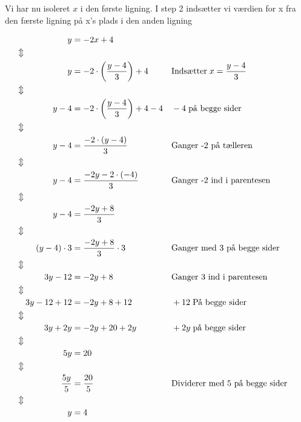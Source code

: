 Vi har nu isoleret $x$ i den første ligning. I step 2 indsætter vi værdien for x fra den færste ligning på x's plads i den anden ligning

\begin{align*}
    y &= -2x + 4\\
    \Updownarrow \hspace{2cm}&\\
    y &= -2\cdot \left(\frac{y - 4}{3}\right) + 4 && \text{Indsætter} \hspace{1mm} x = \frac{y - 4}{3}\\
    \Updownarrow \hspace{2cm}&\\
    y - 4 &= -2\cdot \left(\frac{y - 4}{3}\right) + 4 - 4 && -4 \hspace{1mm} \text{på begge sider}\\
    \Updownarrow \hspace{2cm}&\\
    y - 4 &= \frac{-2\cdot (y - 4)}{3}&& \text{Ganger -2 på tælleren}\\
    \Updownarrow \hspace{2cm}&\\
    y - 4 &= \frac{-2y -2\cdot (-4)}{3} && \text{Ganger -2 ind i parentesen}\\
    \Updownarrow \hspace{2cm}&\\
    y - 4 &= \frac{-2y + 8}{3}\\
    \Updownarrow \hspace{2cm}&\\
    (y - 4) \cdot 3 &= \frac{-2y + 8}{3} \cdot 3 && \text{Ganger med 3 på begge sider}\\
    \Updownarrow \hspace{2cm}&\\
    3y - 12 &= -2y + 8 && \text{Ganger 3 ind i parentesen}\\
    \Updownarrow \hspace{2cm}&\\
    3y - 12 + 12 &= -2y + 8 + 12 && +12 \hspace{1mm} \text{På begge sider}\\
    \Updownarrow \hspace{2cm}&\\
    3y + 2y &= -2y + 20 + 2y && +2y \hspace{1mm} \text{på begge sider}\\
    \Updownarrow \hspace{2cm}&\\
    5y &= 20\\
    \Updownarrow \hspace{2cm}&\\
    \frac{5y}{5} &= \frac{20}{5} && \text{Dividerer med 5 på begge sider}\\
    \Updownarrow \hspace{2cm}&\\
    y &= 4
\end{align*}

